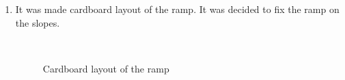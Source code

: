 \begin{enumerate}
\begin{enumerate}
		 \item It was made cardboard layout of the ramp. It was decided to fix the ramp on the slopes. 
		 		         \begin{figure}[H]
		 		         	\begin{minipage}[h]{0.2\linewidth}
		 		         		\center  
		 		         	\end{minipage}
		 		         	\begin{minipage}[h]{0.6\linewidth}
		 		         		\caption{Cardboard layout of the ramp}
		 		         	\end{minipage}
		 		         \end{figure}
		 

\end{enumerate}
\end{enumerate}
